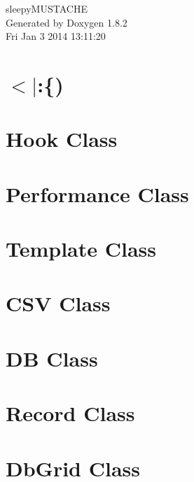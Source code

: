 \documentclass{book}
\begin{document}
\hypersetup{pageanchor=false,citecolor=blue}
\begin{titlepage}
\vspace*{7cm}
\begin{center}
{\Large sleepy\-M\-U\-S\-T\-A\-C\-H\-E }\\
\vspace*{1cm}
{\large Generated by Doxygen 1.8.2}\\
\vspace*{0.5cm}
{\small Fri Jan 3 2014 13:11:20}\\
\end{center}
\end{titlepage}
\clearemptydoublepage
{}
\tableofcontents
\clearemptydoublepage
{}
\hypersetup{pageanchor=true,citecolor=blue}
\chapter{$<$$|$\-:\{)}
\label{index}\hypertarget{index}{}
\chapter{Hook Class}
\label{hooks1}
\hypertarget{hooks1}{}

\chapter{Performance Class}
\label{perf1}
\hypertarget{perf1}{}

\chapter{Template Class}
\label{template1}
\hypertarget{template1}{}

\chapter{C\-S\-V Class}
\label{csv1}
\hypertarget{csv1}{}

\chapter{D\-B Class}
\label{db1}
\hypertarget{db1}{}

\chapter{Record Class}
\label{record1}
\hypertarget{record1}{}

\chapter{Db\-Grid Class}
\label{dbgrid1}
\hypertarget{dbgrid1}{}

\end{document}
